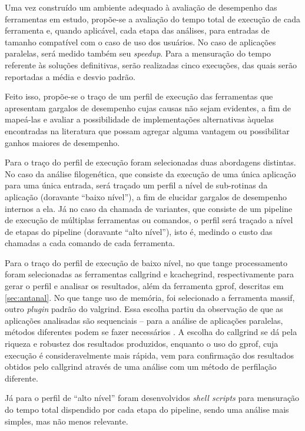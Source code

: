 \documentclass[cic,tc]{iiufrgs}
\begin{document}
Uma vez construído um ambiente adequado à avaliação de desempenho das
ferramentas em estudo, propõe-se a avaliação do tempo total de execução de cada
ferramenta e, quando aplicável, cada etapa das análises, para entradas de
tamanho compatível com o caso de uso dos usuários. No caso de aplicações
paralelas, será medido também seu \textit{speedup}. Para a mensuração do tempo
referente às soluções definitivas, serão realizadas cinco execuções, das quais
serão reportadas a média e desvio padrão.

Feito isso, propõe-se o traço de um perfil de execução das ferramentas que
apresentam gargalos de desempenho cujas causas não sejam evidentes, a fim de
mapeá-las e avaliar a possibilidade de implementações alternativas àquelas
encontradas na literatura que possam agregar alguma vantagem ou possibilitar
ganhos maiores de desempenho.

Para o traço do perfil de execução foram selecionadas duas abordagens
distintas. No caso da análise filogenética, que consiste da execução de uma
única aplicação para uma única entrada, será traçado um perfil a nível de
sub-rotinas da aplicação (doravante ``baixo nível''), a fim de elucidar gargalos
de desempenho internos a ela. Já no caso da chamada de variantes, que consiste
de um pipeline de execução de múltiplas ferramentas ou comandos, o perfil será
traçado a nível de etapas do pipeline (doravante ``alto nível''), isto é,
medindo o custo das chamadas a cada comando de cada ferramenta.

Para o traço do perfil de execução de baixo nível, no que tange processamento
foram selecionadas as ferramentas callgrind e kcachegrind, respectivamente para
gerar o perfil e analisar os resultados, além da ferramenta gprof, descritas em
\ref{sec:antanal}. No que tange uso de memória, foi selecionado a ferramenta
massif, outro \textit{plugin} padrão do valgrind. Essa escolha partiu da
observação de que as aplicações analisadas são sequenciais -- para a análise de
aplicações paralelas, métodos diferentes podem se fazer necessários
\cite{weidendorfer2008sequential}. A escolha do callgrind se dá pela riqueza e
robustez dos resultados produzidos, enquanto o uso do gprof, cuja execução é
consideravelmente mais rápida, vem para confirmação dos resultados obtidos pelo
callgrind através de uma análise com um método de perfilação diferente.

Já para o perfil de ``alto nível'' foram desenvolvidos \textit{shell scripts}
para mensuração do tempo total dispendido por cada etapa do pipeline, sendo uma
análise mais simples, mas não menos relevante.
\end{document}
